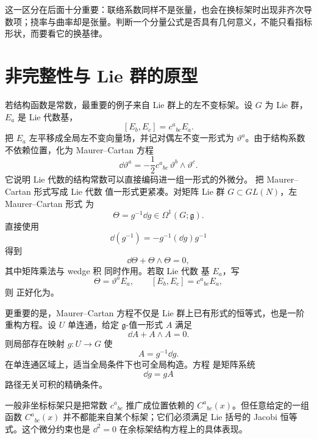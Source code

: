 这一区分在后面十分重要：联络系数同样不是张量，也会在换标架时出现非齐次导数项；挠率与曲率却是张量。判断一个分量公式是否具有几何意义，不能只看指标形状，而要看它的换基律。

\section{非完整性与 Lie 群的原型}
若结构函数是常数，最重要的例子来自 Lie 群上的左不变标架。设 $G$ 为 Lie 群，$E_a$ 是 Lie 代数基，
\[
[E_b,E_c]=c^a{}_{bc}E_a.
\]
把 $E_a$ 左平移成全局左不变向量场，并记对偶左不变一形式为 $\vartheta^a$。由于结构系数不依赖位置，化为 Maurer--Cartan 方程
\begin{equation}\label{eq:math-dg-maurer-cartan}
\boxed{
\dd\vartheta^a
=-\frac12c^a{}_{bc}\,\vartheta^b\wedge\vartheta^c.}
\end{equation}
它说明 Lie 代数的结构常数可以直接编码进一组一形式的外微分。
把 Maurer--Cartan 形式写成 Lie 代数 值一形式更紧凑。对矩阵 Lie 群 $G\subset GL(N)$，左 Maurer--Cartan 形式 为
\begin{equation*}\Theta=g^{-1}\dd g\in\Omega^1(G;\mathfrak g).\end{equation*}
直接使用
\[
\dd(g^{-1})=-g^{-1}(\dd g)g^{-1}
\]
得到
\begin{equation}
\dd\Theta+\Theta\wedge\Theta=0,
\label{eq:matrix-maurer-cartan-equation}
\end{equation}
其中矩阵乘法与 wedge 积 同时作用。若取 Lie 代数 基 $E_a$，写
\[
\Theta=\vartheta^aE_a,
\qquad
[E_b,E_c]=c^a{}_{bc}E_a,
\]
则 正好化为。

更重要的是，Maurer--Cartan 方程不仅是 Lie 群上已有形式的恒等式，也是一阶重构方程。设 $U$ 单连通，给定 $\mathfrak g$-值一形式 $A$ 满足
\begin{equation}
\dd A+A\wedge A=0.
\label{eq:mc-flat-integrability}
\end{equation}
则局部存在映射 $g:U\to G$ 使
\begin{equation}
A=g^{-1}\dd g.
\label{eq:mc-pure-gauge}
\end{equation}
在单连通区域上，适当全局条件下也可全局构造。方程 是矩阵系统
\[
\dd g=gA
\]
路径无关可积的精确条件。

一般非坐标标架只是把常数 $c^a{}_{bc}$ 推广成位置依赖的 $C^a{}_{bc}(x)$。但任意给定的一组函数 $C^a{}_{bc}(x)$ 并不都能来自某个标架；它们必须满足 Lie 括号的 Jacobi 恒等式。这个微分约束也是 $\dd^2=0$ 在余标架结构方程上的具体表现。

